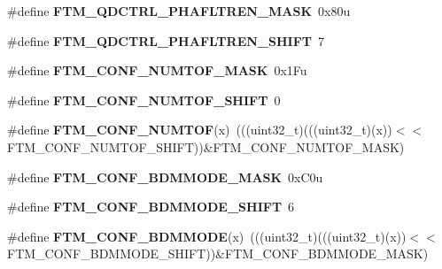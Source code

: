 \begin{DoxyCompactItemize}
\item 
\#define {\bfseries F\+T\+M\+\_\+\+Q\+D\+C\+T\+R\+L\+\_\+\+P\+H\+A\+F\+L\+T\+R\+E\+N\+\_\+\+M\+A\+SK}~0x80u\hypertarget{group__FTM__Register__Masks_ga1284593b1a9c13205dbbbf5647659049}{}\label{group__FTM__Register__Masks_ga1284593b1a9c13205dbbbf5647659049}

\item 
\#define {\bfseries F\+T\+M\+\_\+\+Q\+D\+C\+T\+R\+L\+\_\+\+P\+H\+A\+F\+L\+T\+R\+E\+N\+\_\+\+S\+H\+I\+FT}~7\hypertarget{group__FTM__Register__Masks_ga8d2e6d6756632fdfe6efced044320d48}{}\label{group__FTM__Register__Masks_ga8d2e6d6756632fdfe6efced044320d48}

\item 
\#define {\bfseries F\+T\+M\+\_\+\+C\+O\+N\+F\+\_\+\+N\+U\+M\+T\+O\+F\+\_\+\+M\+A\+SK}~0x1\+Fu\hypertarget{group__FTM__Register__Masks_gae8e95c8cac97f0cf6cec2edd277aaca3}{}\label{group__FTM__Register__Masks_gae8e95c8cac97f0cf6cec2edd277aaca3}

\item 
\#define {\bfseries F\+T\+M\+\_\+\+C\+O\+N\+F\+\_\+\+N\+U\+M\+T\+O\+F\+\_\+\+S\+H\+I\+FT}~0\hypertarget{group__FTM__Register__Masks_ga6ee8ba517c1d833d785fbe2fb0344726}{}\label{group__FTM__Register__Masks_ga6ee8ba517c1d833d785fbe2fb0344726}

\item 
\#define {\bfseries F\+T\+M\+\_\+\+C\+O\+N\+F\+\_\+\+N\+U\+M\+T\+OF}(x)~(((uint32\+\_\+t)(((uint32\+\_\+t)(x))$<$$<$F\+T\+M\+\_\+\+C\+O\+N\+F\+\_\+\+N\+U\+M\+T\+O\+F\+\_\+\+S\+H\+I\+FT))\&F\+T\+M\+\_\+\+C\+O\+N\+F\+\_\+\+N\+U\+M\+T\+O\+F\+\_\+\+M\+A\+SK)\hypertarget{group__FTM__Register__Masks_gaa084b68452f9be9a4f5231e046ff416e}{}\label{group__FTM__Register__Masks_gaa084b68452f9be9a4f5231e046ff416e}

\item 
\#define {\bfseries F\+T\+M\+\_\+\+C\+O\+N\+F\+\_\+\+B\+D\+M\+M\+O\+D\+E\+\_\+\+M\+A\+SK}~0x\+C0u\hypertarget{group__FTM__Register__Masks_ga832712efda712d40d626989b691a0647}{}\label{group__FTM__Register__Masks_ga832712efda712d40d626989b691a0647}

\item 
\#define {\bfseries F\+T\+M\+\_\+\+C\+O\+N\+F\+\_\+\+B\+D\+M\+M\+O\+D\+E\+\_\+\+S\+H\+I\+FT}~6\hypertarget{group__FTM__Register__Masks_gacb37f407e308d688a6bcb6a50d67730f}{}\label{group__FTM__Register__Masks_gacb37f407e308d688a6bcb6a50d67730f}

\item 
\#define {\bfseries F\+T\+M\+\_\+\+C\+O\+N\+F\+\_\+\+B\+D\+M\+M\+O\+DE}(x)~(((uint32\+\_\+t)(((uint32\+\_\+t)(x))$<$$<$F\+T\+M\+\_\+\+C\+O\+N\+F\+\_\+\+B\+D\+M\+M\+O\+D\+E\+\_\+\+S\+H\+I\+FT))\&F\+T\+M\+\_\+\+C\+O\+N\+F\+\_\+\+B\+D\+M\+M\+O\+D\+E\+\_\+\+M\+A\+SK)\hypertarget{group__FTM__Register__Masks_gac35551a6fb1df02d6a0d83b0ec4df82a}{}\label{group__FTM__Register__Masks_gac35551a6fb1df02d6a0d83b0ec4df82a}


\end{DoxyCompactItemize}
